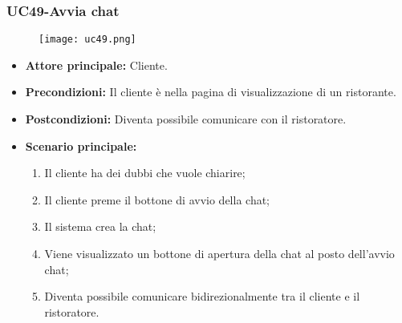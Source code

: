 \pagebreak
\subsubsection{UC49-Avvia chat}
\begin{figure}[h] \texttt{[image: uc49.png]} \end{figure}
\begin{itemize}
\item \textbf{Attore principale:} Cliente.
\item \textbf{Precondizioni:} Il cliente è nella pagina di visualizzazione di un ristorante.
\item \textbf{Postcondizioni:} Diventa possibile comunicare con il ristoratore.
\item \textbf{Scenario principale:}
\begin{enumerate}
    \item Il cliente ha dei dubbi che vuole chiarire;
    \item Il cliente preme il bottone di avvio della chat;
    \item Il sistema crea la chat;
    \item Viene visualizzato un bottone di apertura della chat al posto dell'avvio chat;
    \item Diventa possibile comunicare bidirezionalmente tra il cliente e il ristoratore.
\end{enumerate}
\end{itemize}

